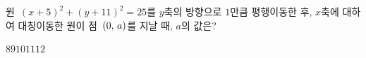 원~$(x+5)^2+(y+11)^2=25$를 $y$축의 방향으로 $1$만큼 평행이동한 후, $x$축에 대하여 대칭이동한 원이 점~$(0,\mkern3mu a)$를 지날 때, $a$의 값은?
\begin{choices32}{$8$}{$9$}{$10$}{$11$}{$12$}\end{choices32}
